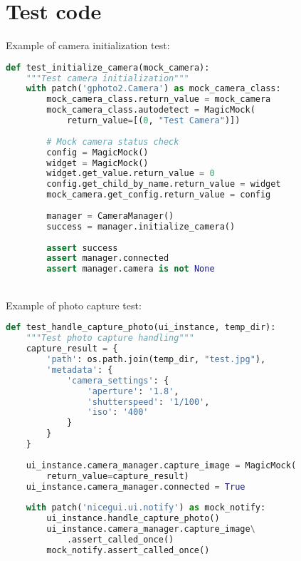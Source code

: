 \section{Test code}
Example of camera initialization test:
\begin{lstlisting}[language=Python]
def test_initialize_camera(mock_camera):
    """Test camera initialization"""
    with patch('gphoto2.Camera') as mock_camera_class:
        mock_camera_class.return_value = mock_camera
        mock_camera_class.autodetect = MagicMock(
            return_value=[(0, "Test Camera")])
        
        # Mock camera status check
        config = MagicMock()
        widget = MagicMock()
        widget.get_value.return_value = 0
        config.get_child_by_name.return_value = widget
        mock_camera.get_config.return_value = config
        
        manager = CameraManager()
        success = manager.initialize_camera()
        
        assert success
        assert manager.connected
        assert manager.camera is not None
\end{lstlisting}
\\
Example of photo capture test:
\begin{lstlisting}[language=Python]
def test_handle_capture_photo(ui_instance, temp_dir):
    """Test photo capture handling"""
    capture_result = {
        'path': os.path.join(temp_dir, "test.jpg"),
        'metadata': {
            'camera_settings': {
                'aperture': '1.8',
                'shutterspeed': '1/100',
                'iso': '400'
            }
        }
    }
    
    ui_instance.camera_manager.capture_image = MagicMock(
        return_value=capture_result)
    ui_instance.camera_manager.connected = True
    
    with patch('nicegui.ui.notify') as mock_notify:
        ui_instance.handle_capture_photo()
        ui_instance.camera_manager.capture_image\
            .assert_called_once()
        mock_notify.assert_called_once()
\end{lstlisting}
